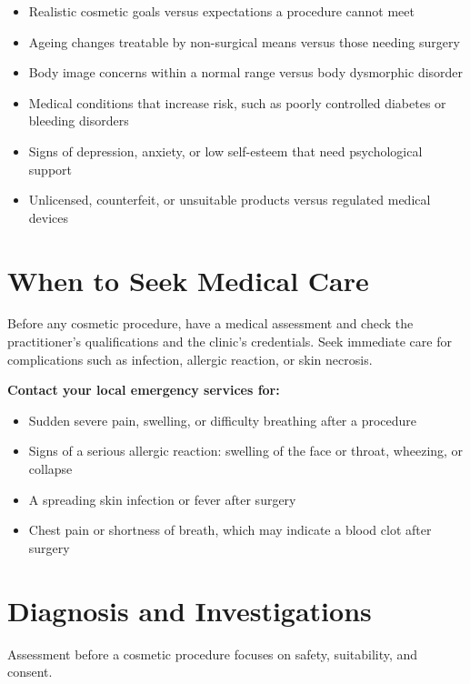 \begin{itemize}
    \item Realistic cosmetic goals versus expectations a procedure cannot meet
    \item Ageing changes treatable by non-surgical means versus those needing surgery
    \item Body image concerns within a normal range versus body dysmorphic disorder
    \item Medical conditions that increase risk, such as poorly controlled diabetes or bleeding disorders
    \item Signs of depression, anxiety, or low self-esteem that need psychological support
    \item Unlicensed, counterfeit, or unsuitable products versus regulated medical devices
\end{itemize}

\section*{When to Seek Medical Care}
Before any cosmetic procedure, have a medical assessment and check the practitioner's qualifications and the clinic's credentials. Seek immediate care for complications such as infection, allergic reaction, or skin necrosis.

\textbf{Contact your local emergency services for:}
\begin{itemize}
    \item Sudden severe pain, swelling, or difficulty breathing after a procedure
    \item Signs of a serious allergic reaction: swelling of the face or throat, wheezing, or collapse
    \item A spreading skin infection or fever after surgery
    \item Chest pain or shortness of breath, which may indicate a blood clot after surgery
\end{itemize}

\section*{Diagnosis and Investigations}
Assessment before a cosmetic procedure focuses on safety, suitability, and consent.

